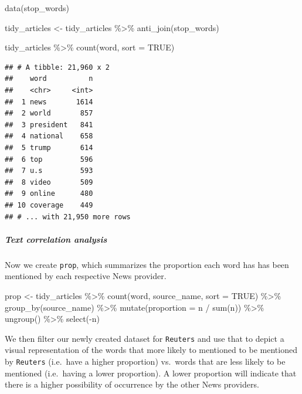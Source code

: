 \documentclass[
]{article}
\newenvironment{Shaded}{\begin{snugshade}}{\end{snugshade}}
\newcommand{\AttributeTok}[1]{\textcolor[rgb]{0.77,0.63,0.00}{#1}}
\newcommand{\ConstantTok}[1]{\textcolor[rgb]{0.00,0.00,0.00}{#1}}
\newcommand{\FunctionTok}[1]{\textcolor[rgb]{0.00,0.00,0.00}{#1}}
\newcommand{\NormalTok}[1]{#1}
\newcommand{\OtherTok}[1]{\textcolor[rgb]{0.56,0.35,0.01}{#1}}
\newcommand{\SpecialCharTok}[1]{\textcolor[rgb]{0.00,0.00,0.00}{#1}}
\begin{document}
\begin{Shaded}
\begin{Highlighting}[]
\FunctionTok{data}\NormalTok{(stop\_words)}

\NormalTok{tidy\_articles }\OtherTok{\textless{}{-}}\NormalTok{ tidy\_articles }\SpecialCharTok{\%\textgreater{}\%}
                  \FunctionTok{anti\_join}\NormalTok{(stop\_words)}

\NormalTok{tidy\_articles }\SpecialCharTok{\%\textgreater{}\%}
  \FunctionTok{count}\NormalTok{(word, }\AttributeTok{sort =} \ConstantTok{TRUE}\NormalTok{)}
\end{Highlighting}
\end{Shaded}

\begin{verbatim}
## # A tibble: 21,960 x 2
##    word          n
##    <chr>     <int>
##  1 news       1614
##  2 world       857
##  3 president   841
##  4 national    658
##  5 trump       614
##  6 top         596
##  7 u.s         593
##  8 video       509
##  9 online      480
## 10 coverage    449
## # ... with 21,950 more rows
\end{verbatim}

\hypertarget{text-correlation-analysis}{%
\subparagraph{\texorpdfstring{\textbf{Text correlation
analysis}}{Text correlation analysis}}\label{text-correlation-analysis}}

Now we create \texttt{prop}, which summarizes the proportion each word
has has been mentioned by each respective News provider.

\begin{Shaded}
\begin{Highlighting}[]
\NormalTok{prop }\OtherTok{\textless{}{-}}\NormalTok{ tidy\_articles }\SpecialCharTok{\%\textgreater{}\%}
        \FunctionTok{count}\NormalTok{(word, source\_name, }\AttributeTok{sort =} \ConstantTok{TRUE}\NormalTok{) }\SpecialCharTok{\%\textgreater{}\%}
        \FunctionTok{group\_by}\NormalTok{(source\_name) }\SpecialCharTok{\%\textgreater{}\%}
        \FunctionTok{mutate}\NormalTok{(}\AttributeTok{proportion =}\NormalTok{ n }\SpecialCharTok{/} \FunctionTok{sum}\NormalTok{(n)) }\SpecialCharTok{\%\textgreater{}\%}
        \FunctionTok{ungroup}\NormalTok{() }\SpecialCharTok{\%\textgreater{}\%}
        \FunctionTok{select}\NormalTok{(}\SpecialCharTok{{-}}\NormalTok{n)}
\end{Highlighting}
\end{Shaded}

We then filter our newly created dataset for \texttt{Reuters} and use
that to depict a visual representation of the words that more likely to
mentioned to be mentioned by \texttt{Reuters} (i.e.~have a higher
proportion) vs.~words that are less likely to be mentioned (i.e.~having
a lower proportion). A lower proportion will indicate that there is a
higher possibility of occurrence by the other News providers.
\end{document}
